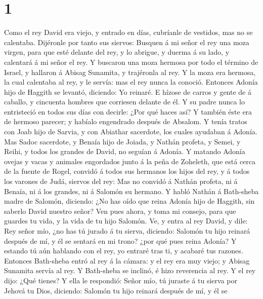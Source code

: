\hypertarget{section}{%
\section{1}\label{section}}

 Como el rey David era viejo, y entrado en días, cubríanle
de vestidos, mas no se calentaba.  Dijéronle por tanto sus
siervos: Busquen á mi señor el rey una moza virgen, para que esté
delante del rey, y lo abrigue, y duerma á su lado, y calentará á mi
señor el rey.  Y buscaron una moza hermosa por todo el
término de Israel, y hallaron á Abisag Sunamita, y trajéronla al rey.
 Y la moza era hermosa, la cual calentaba al rey, y le
servía: mas el rey nunca la conoció.  Entonces Adonía hijo
de Haggith se levantó, diciendo: Yo reinaré. E hízose de carros y gente
de á caballo, y cincuenta hombres que corriesen delante de él.
 Y su padre nunca lo entristeció en todos sus días con
decirle: ¿Por qué haces así? Y también éste era de hermoso parecer; y
habíalo engendrado después de Absalom.  Y tenía tratos con
Joab hijo de Sarvia, y con Abiathar sacerdote, los cuales ayudaban á
Adonía.  Mas Sadoc sacerdote, y Benaía hijo de Joiada, y
Nathán profeta, y Semei, y Reihi, y todos los grandes de David, no
seguían á Adonía.  Y matando Adonía ovejas y vacas y
animales engordados junto á la peña de Zoheleth, que está cerca de la
fuente de Rogel, convidó á todos sus hermanos los hijos del rey, y á
todos los varones de Judá, siervos del rey:  Mas no convidó
á Nathán profeta, ni á Benaía, ni á los grandes, ni á Salomón su
hermano.  Y habló Nathán á Bath-sheba madre de Salomón,
diciendo: ¿No has oído que reina Adonía hijo de Haggith, sin saberlo
David nuestro señor?  Ven pues ahora, y toma mi consejo,
para que guardes tu vida, y la vida de tu hijo Salomón. 
Ve, y entra al rey David, y dile: Rey señor mío, ¿no has tú jurado á tu
sierva, diciendo: Salomón tu hijo reinará después de mí, y él se sentará
en mi trono? ¿por qué pues reina Adonía?  Y estando tú aún
hablando con el rey, yo entraré tras ti, y acabaré tus razones.
 Entonces Bath-sheba entró al rey á la cámara: y el rey era
muy viejo; y Abisag Sunamita servía al rey.  Y Bath-sheba
se inclinó, é hizo reverencia al rey. Y el rey dijo: ¿Qué tienes?
 Y ella le respondió: Señor mío, tú juraste á tu sierva por
Jehová tu Dios, diciendo: Salomón tu hijo reinará después de mí, y él se
